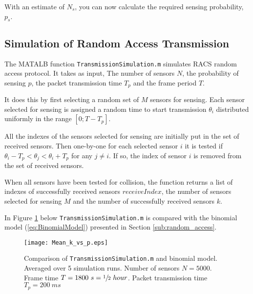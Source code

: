 \documentclass[Main]{subfiles}
\begin{document}
		With an estimate of $N_s$, you can now calculate the required sensing probability, $p_s$.

	\subsection{Simulation of Random Access Transmission} %
	\label{sub:simulation_of_random_access_transmission}

		The MATALB function \texttt{TransmissionSimulation.m} simulates RACS random access protocol.
		It takes as input, The number of sensors $N$, the probability of sensing $p$, the packet transmission time $T_p$ and the frame period $T$.

		It does this by first selecting a random set of $M$ sensors for sensing.
		Each sensor selected for sensing is assigned a random time to start transmission $\theta_i$ distributed uniformly in the range $[0 ; T - T_p]$.

		All the indexes of the sensors selected for sensing are initially put in the set of received sensors.
		Then one-by-one for each selected sensor $i$ it is tested if 
		$\theta_i - T_p < \theta_j < \theta_i + T_p$
		for any
		$j \neq i$.
		If so, the index of sensor $i$ is removed from the set of received sensors.

		When all sensors have been tested for collision, the function returns a list of indexes of successfully received sensors $receiveIndex$, the number of sensors selected for sensing $M$ and the number of successfully received sensors $k$.

		In Figure \ref{fig:Mean_k_vs_p} below \texttt{TransmissionSimulation.m} is compared with the binomial model (\ref{eq:BinomialModel}) presented in Section \ref{sub:random_access}.

		\begin{figure}[H]
			\centering 
			\texttt{[image: Mean\_k\_vs\_p.eps]}
			\caption{Comparison of \texttt{TransmissionSimulation.m} and binomial model. Averaged over 5 simulation runs.
			Number of sensors $N = 5000$.
			Frame time $T = 1800\ s = \sfrac{1}{2}\ hour$.
			Packet transmission time $T_p = 200\ ms$}
			\label{fig:Mean_k_vs_p}
		\end{figure}

	
\end{document}
